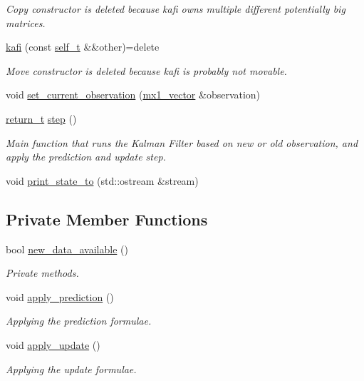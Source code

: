 \begin{DoxyCompactItemize}
\begin{DoxyCompactList}\small\item\em Copy constructor is deleted because kafi owns multiple different potentially big matrices. \end{DoxyCompactList}\item 
\hyperlink{classkafi_1_1kafi_ac2331ba8c5ad075cbdb6580eb41bf9eb}{kafi} (const \hyperlink{classkafi_1_1kafi_a9fc1cf6d76a14493ec33c03f3a3699c7}{self\+\_\+t} \&\&other)=delete
\begin{DoxyCompactList}\small\item\em Move constructor is deleted because kafi is probably not movable. \end{DoxyCompactList}\item 
void \hyperlink{classkafi_1_1kafi_a8bb1520922ac9bab7479c89a9681b956}{set\+\_\+current\+\_\+observation} (\hyperlink{classkafi_1_1kafi_a3a6f412f435a9e1f81178f36965822c3}{mx1\+\_\+vector} \&observation)
\item 
\hyperlink{classkafi_1_1kafi_a7dcd4a6f44ce454d56328f38ab053927}{return\+\_\+t} \hyperlink{classkafi_1_1kafi_ae78f8f011e499e806294d6e6575a47c3}{step} ()
\begin{DoxyCompactList}\small\item\em Main function that runs the Kalman Filter based on new or old observation, and apply the prediction and update step. \end{DoxyCompactList}\item 
void \hyperlink{classkafi_1_1kafi_ac9627c8086987fb34edc5ef85abee316}{print\+\_\+state\+\_\+to} (std\+::ostream \&stream)
\end{DoxyCompactItemize}
\subsection*{Private Member Functions}
\begin{DoxyCompactItemize}
\item 
bool \hyperlink{classkafi_1_1kafi_a29ff5938b1fd205fe3861370d6455227}{new\+\_\+data\+\_\+available} ()
\begin{DoxyCompactList}\small\item\em Private methods. \end{DoxyCompactList}\item 
void \hyperlink{classkafi_1_1kafi_a0e5b7cf6b263950c54270e27287f24f2}{apply\+\_\+prediction} ()
\begin{DoxyCompactList}\small\item\em Applying the prediction formulae. \end{DoxyCompactList}\item 
void \hyperlink{classkafi_1_1kafi_a4e90a69f858c0c49f7fde168561da254}{apply\+\_\+update} ()
\begin{DoxyCompactList}\small\item\em Applying the update formulae. \end{DoxyCompactList}\end{DoxyCompactItemize}
